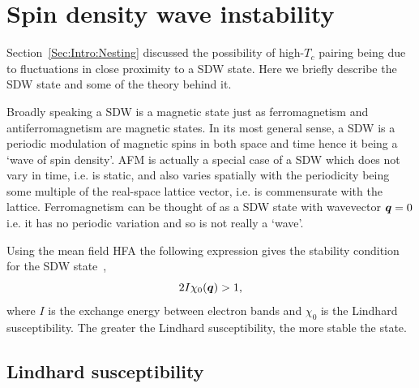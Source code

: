 
\section{Spin density wave instability}
\label{Sec:Theo:SpinDensityWave}

Section~\ref{Sec:Intro:Nesting} discussed the possibility of high-$T_c$ pairing being due to fluctuations in close proximity to a \ac{SDW} state. Here we briefly describe the \ac{SDW} state and some of the theory behind it.

Broadly speaking a \ac{SDW} is a magnetic state just as ferromagnetism and antiferromagnetism are magnetic states. In its most general sense, a \ac{SDW} is a periodic modulation of magnetic spins in both space and time hence it being a `wave of spin density'. \ac{AFM} is actually a special case of a \ac{SDW} which does not vary in time, i.e. is static, and also varies spatially with the periodicity being some multiple of the real-space lattice vector, i.e. is commensurate with the lattice. Ferromagnetism can be thought of as a \ac{SDW} state with wavevector $\boldsymbol{q}=0$ i.e. it has no periodic variation and so is not really a `wave'.

Using the mean field \ac{HFA} the following expression gives the stability condition for the \ac{SDW} state~\cite{Moriya1985},
\begin{equation}
    \label{Eqn:Theo:SDWCondition}
2I\chi_0(\boldsymbol{q}) > 1,
\end{equation}
where $I$ is the exchange energy between electron bands and $\chi_0$ is the Lindhard susceptibility. The greater the Lindhard susceptibility, the more stable the state.

\subsection{Lindhard susceptibility}
\label{Sec:Theo:Susceptibility}

